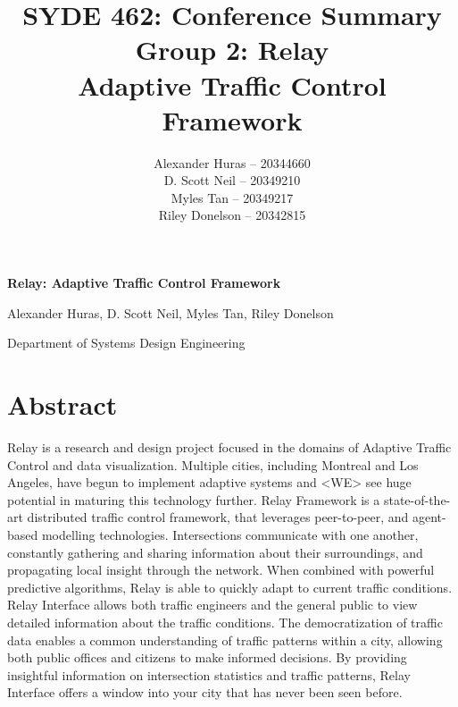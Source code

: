 \documentclass[a4paper,11pt]{report}
\author{  Alexander Huras -- 20344660\\
  D. Scott Neil -- 20349210\\
  Myles Tan -- 20349217\\
  Riley Donelson -- 20342815\\}
\title{SYDE 462: Conference Summary
\\Group 2: Relay \\
  Adaptive Traffic Control Framework}
\begin{document}
%

\centerline{  \bf \LARGE Relay: Adaptive Traffic Control Framework}
\centerline{Alexander Huras, D. Scott Neil, Myles Tan, Riley Donelson}
\centerline{Department of Systems Design Engineering}


\section{Abstract}
Relay is a research and design project focused in the domains of Adaptive Traffic Control and data visualization. Multiple cities, including Montreal and Los Angeles, have begun to implement adaptive systems and <WE> see huge potential in maturing this technology further. Relay Framework is a state-of-the-art distributed traffic control framework, that leverages peer-to-peer, and agent-based modelling technologies. Intersections communicate with one another, constantly gathering and sharing information about their surroundings, and propagating local insight through the network. When combined with powerful predictive algorithms, Relay is able to quickly adapt to current traffic conditions.
Relay Interface allows both traffic engineers and the general public to view detailed information about the traffic conditions. The democratization of traffic data enables a common understanding of traffic patterns within a city, allowing both public offices and citizens to make informed decisions. By providing insightful information on intersection statistics and traffic patterns, Relay Interface offers a window into your city that has never been seen before.
\end{document}
